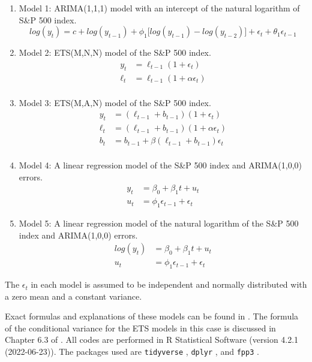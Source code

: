\documentclass{monashthesis}
\begin{document}
\begin{enumerate}
\def\labelenumi{\arabic{enumi}.}
\item
  Model 1: ARIMA(1,1,1) model with an intercept of the natural logarithm of S\&P 500 index.
  \begin{equation*}
  log(y_t) = c + log(y_{t-1}) + \phi_1\big[log(y_{t-1})-log(y_{t-2})\big] + \epsilon_t + \theta_1\epsilon_{t-1}
  \end{equation*}
\item
  Model 2: ETS(M,N,N) model of the S\&P 500 index.
  \begin{align*}
  y_t &= \ell_{t-1} (1+\epsilon_t) \\
  \ell_t &= \ell_{t-1} (1+\alpha \epsilon_t) \\
  \end{align*}
\item
  Model 3: ETS(M,A,N) model of the S\&P 500 index.
  \begin{align*}
  y_t &= (\ell_{t-1} + b_{t-1})(1+\epsilon_t) \\
  \ell_t &= (\ell_{t-1} + b_{t-1}) (1+\alpha \epsilon_t) \\
  b_t &= b_{t-1} + \beta (\ell_{t-1} + b_{t-1})\epsilon_t \\
  \end{align*}
\item
  Model 4: A linear regression model of the S\&P 500 index and ARIMA(1,0,0) errors.
  \begin{align*}
  y_t &= \beta_0 + \beta_1 t + u_t \\
  u_t &= \phi_1 \epsilon_{t-1} + \epsilon_t
  \end{align*}
\item
  Model 5: A linear regression model of the natural logarithm of the S\&P 500 index and ARIMA(1,0,0) errors.
  \begin{align*}
  log(y_t) &= \beta_0 + \beta_1 t + u_t \\
  u_t &= \phi_1 \epsilon_{t-1} + \epsilon_t
  \end{align*}
\end{enumerate}

The \(\epsilon_t\) in each model is assumed to be independent and normally distributed with a zero mean and a constant variance.

Exact formulas and explanations of these models can be found in \textcite{fpp3}. The formula of the conditional variance for the ETS models in this case is discussed in Chapter 6.3 of \textcite{HKOS08}. All codes are performed in R Statistical Software (version 4.2.1 (2022-06-23)). The packages used are \texttt{tidyverse} \autocite{tidy19}, \texttt{dplyr} \autocite{dplyr23}, and \texttt{fpp3} \autocite{fpp23}.
\end{document}
